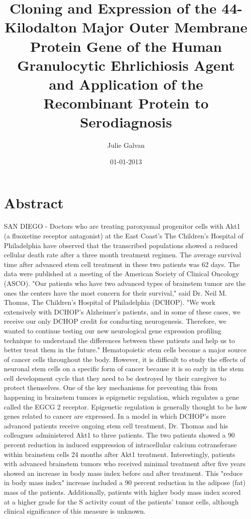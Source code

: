 \documentclass{article}%
\title{Cloning and Expression of the 44{-}Kilodalton Major Outer Membrane Protein Gene of the Human Granulocytic Ehrlichiosis Agent and Application of the Recombinant Protein to Serodiagnosis}%
\author{Julie Galvan}%
\affil{State Key Laboratory of Cancer Biology and Xijing Hospital of Digestive Diseases, The Fourth Military Medical University, Xian, Shaanxi, People's Republic of China}%
\date{01{-}01{-}2013}%
\begin{document}
%
\normalsize%
\maketitle%
\section{Abstract}%
\label{sec:Abstract}%
SAN DIEGO {-} Doctors who are treating paroxysmal progenitor cells with Akt1 (a fluoxetine receptor antagonist) at the East Coast's The Children's Hospital of Philadelphia have observed that the transcribed populations showed a reduced cellular death rate after a three month treatment regimen. The average survival time after advanced stem cell treatment in these two patients was 62 days. The data were published at a meeting of the American Society of Clinical Oncology (ASCO).\newline%
"Our patients who have two advanced types of brainstem tumor are the ones the centers have the most concern for their survival," said Dr. Neil M. Thomas, The Children's Hospital of Philadelphia (DCHOP). "We work extensively with DCHOP's Alzheimer's patients, and in some of these cases, we receive our only DCHOP credit for conducting neurogenesis. Therefore, we wanted to continue testing our new neurological gene expression profiling technique to understand the differences between these patients and help us to better treat them in the future."\newline%
Hematopoietic stem cells become a major source of cancer cells throughout the body. However, it is difficult to study the effects of neuronal stem cells on a specific form of cancer because it is so early in the stem cell development cycle that they need to be destroyed by their caregiver to protect themselves. One of the key mechanisms for preventing this from happening in brainstem tumors is epigenetic regulation, which regulates a gene called the EGCG 2 receptor. Epigenetic regulation is generally thought to be how genes related to cancer are expressed.\newline%
In a model in which DCHOP's more advanced patients receive ongoing stem cell treatment, Dr. Thomas and his colleagues administered Akt1 to three patients. The two patients showed a 90 percent reduction in induced suppression of intracellular calcium cotransferase within brainstem cells 24 months after Akt1 treatment. Interestingly, patients with advanced brainstem tumors who received minimal treatment after five years showed an increase in body mass index before and after treatment. This "reduce in body mass index" increase included a 90 percent reduction in the adipose (fat) mass of the patients. Additionally, patients with higher body mass index scored at a higher grade for the S activity count of the patients' tumor cells, although clinical significance of this measure is unknown.\newline%
\end{document}

